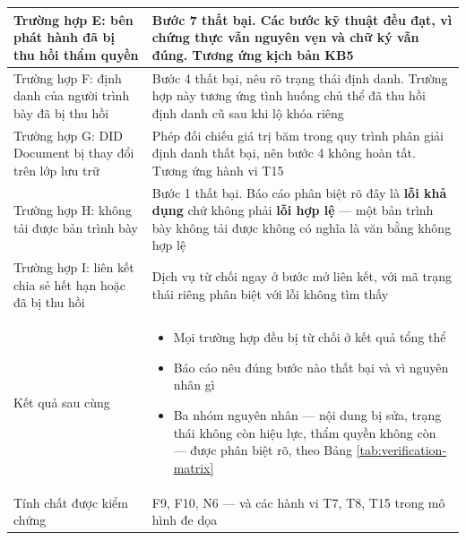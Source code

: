 \begin{longtable}{|p{3.4cm}|p{10.3cm}|}
Trường hợp E: bên phát hành đã bị thu hồi thẩm quyền &
Bước 7 thất bại. Các bước kỹ thuật đều đạt, vì chứng thực vẫn nguyên vẹn và chữ ký vẫn đúng. Tương ứng kịch bản KB5 \\
\hline

Trường hợp F: định danh của người trình bày đã bị thu hồi &
Bước 4 thất bại, nêu rõ trạng thái định danh. Trường hợp này tương ứng tình huống chủ thể đã thu hồi định danh cũ sau khi lộ khóa riêng \\
\hline

Trường hợp G: DID Document bị thay đổi trên lớp lưu trữ &
Phép đối chiếu giá trị băm trong quy trình phân giải định danh thất bại, nên bước 4 không hoàn tất. Tương ứng hành vi T15 \\
\hline

Trường hợp H: không tải được bản trình bày &
Bước 1 thất bại. Báo cáo phân biệt rõ đây là \textbf{lỗi khả dụng} chứ không phải \textbf{lỗi hợp lệ} --- một bản trình bày không tải được không có nghĩa là văn bằng không hợp lệ \\
\hline

Trường hợp I: liên kết chia sẻ hết hạn hoặc đã bị thu hồi &
Dịch vụ từ chối ngay ở bước mở liên kết, với mã trạng thái riêng phân biệt với lỗi không tìm thấy \\
\hline

Kết quả sau cùng &
\begin{itemize}[leftmargin=*, nosep]
    \item Mọi trường hợp đều bị từ chối ở kết quả tổng thể
    \item Báo cáo nêu đúng bước nào thất bại và vì nguyên nhân gì
    \item Ba nhóm nguyên nhân --- nội dung bị sửa, trạng thái không còn hiệu lực, thẩm quyền không còn --- được phân biệt rõ, theo Bảng \ref{tab:verification-matrix}
\end{itemize} \\
\hline

Tính chất được kiểm chứng &
F9, F10, N6 --- và các hành vi T7, T8, T15 trong mô hình đe dọa \\
\hline

\end{longtable}
